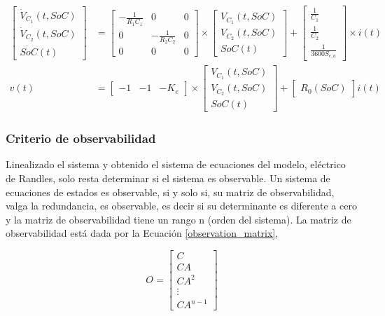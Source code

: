 \documentclass[10pt, a4paper]{report}
\begin{document}
\begin{align}
    \begin{bmatrix}
        \dot{V}_{C_1}(t, SoC) \\ \dot{V}_{C_2}(t, SoC) \\ \dot{SoC}(t)
    \end{bmatrix} &= 
    \begin{bmatrix}
        -\frac{1}{R_1C_1} & 0 & 0\\
        0 & -\frac{1}{R_2C_2} & 0\\
        0 & 0 & 0
    \end{bmatrix}
    \times\begin{bmatrix}V_{C_1}(t, SoC) \\ V_{C_2}(t, SoC) \\ SoC(t)\end{bmatrix}
    +
    \begin{bmatrix}
        \frac{1}{C_1} \\ \frac{1}{C_2} \\ \frac{1}{3600S_{c,a}}
    \end{bmatrix}
    \times i(t)\nonumber \\
    v(t) &= \begin{bmatrix} -1 & -1 & -K_e \end{bmatrix} \times 
    \begin{bmatrix} V_{C_1}(t, SoC) \\ V_{C_2}(t, SoC) \\ SoC(t) \end{bmatrix} +
    \begin{bmatrix} R_0(SoC) \end{bmatrix} i(t)\label{ss_randles_complete}
\end{align}

\subsubsection{Criterio de observabilidad}

Linealizado el sistema y obtenido el sistema de ecuaciones del modelo,
el\'ectrico de Randles, solo resta determinar si el sistema es observable. Un
sistema de ecuaciones de estados es observable, si y solo si, su matriz de
observabilidad, valga la redundancia, es observable, es decir si su determinante 
es diferente a cero y la matriz de observabilidad tiene un rango n 
(orden del sistema). La matriz de observabilidad est\'a dada por la Ecuaci\'on 
\ref{observation_matrix},

\begin{equation}
    O = \begin{bmatrix}
        C\\
        CA\\
        CA^2\\
        \vdots\\
        CA^{n-1}
        \end{bmatrix}\label{observation_matrix}
\end{equation}
\end{document}
